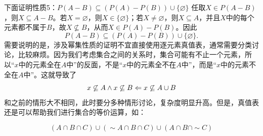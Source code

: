 \documentclass[lang=cn,11pt]{elegantbook}
\begin{document}
下面证明性质5：$ P(A - B) \subseteq (P(A) - P(B))\cup\{\varnothing\}$
任取$X\in P(A-B)$，则$X\subseteq A-B$。若$X=\varnothing$，则$X\in\{\varnothing\}$；若$X\ne\varnothing$，则$X\subseteq A$，并且$X$中的每个元素都不属于$B$，故$X\not\subseteq B$，从而$X\in P(A)-P(B)$。因此
\[
P(A-B)\subseteq (P(A)-P(B))\cup\{\varnothing\}.
\]
需要说明的是，涉及幂集性质的证明不宜直接使用逐元素真值表，通常需要分类讨论，比较麻烦。因为我们考虑集合之间的关系时，集合可能有不止一个元素，所以“$x$中的元素全在$A$中”的反面，不是“$x$中的元素全不在$A$中”，而是“$x$中的元素不全在$A$中”。这就导致了\vspace{-10pt}\[x\not\subseteq A\land x\not\subseteq B\Leftarrow x\not\subseteq A\cup B\vspace{-10pt}\]和之前的情形大不相同，此时要分多种情形讨论，复杂度明显升高。但是，真值表还是可以帮助我们进行集合的等价运算，如：
\begin{example}
\[(A\cap B\cap C)\cup(\sim A\cap B\cap C)\cup(A\cap B\cap\sim C)\]\end{example}
\end{document}
